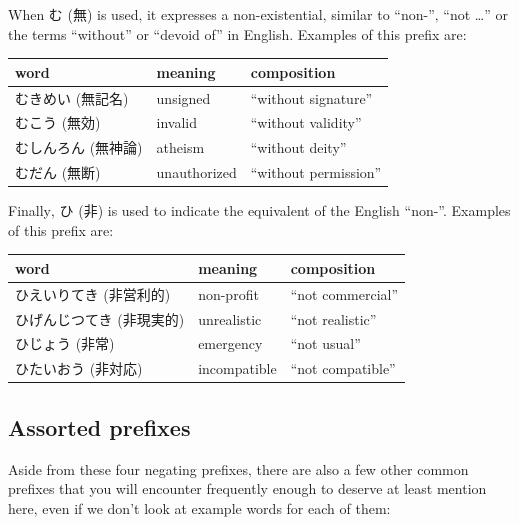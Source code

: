 \documentclass[11pt, b5paper, twoside, openright, onecolumn]{book}
\makeatletter
\newcommand*{\rtrubystack}[2]{{\relscale{0.5}%
  \begin{tabular}[b]{@{}c@{}}%
    {#1}\\%
    {\textscale{2}{#2}}%
  \end{tabular}}%
}
\DeclareRobustCommand*{\rtruby}[2]{%
  \mbox{%
    \setlength{\parskip}{0ex}%
    \BeginAccSupp{method=pdfstringdef,ActualText={#1}}%
      \rtrubystack{\phantom{#2}}{#1}%
      \llap{%
        \rtrubystack{#2}{\phantom{#1}}%
      }%
    \EndAccSupp{}%
  }%
}
\newcommand*{\rubystack}[2]{{\relscale{0.5}%
  \begin{tabular}[b]{@{}c@{}}%
    {#1}\\%
   {\textscale{2}{#2}}%
  \end{tabular}}%
}
\DeclareRobustCommand*{\ruby}[2]{%
  \mbox{%
    \setlength{\parskip}{0ex}%
    \BeginAccSupp{method=pdfstringdef,ActualText={#1}}%
      \rubystack{\phantom{#2}}{#1}%
      \llap{%
        \rubystack{#2}{\phantom{#1}}%
      }%
    \EndAccSupp{}%
  }%
}
\renewcommand*{\rtruby}[2]{#2 (#1)}%
\renewcommand*{\ruby}[2]{#2 (#1)}%
\newenvironment{mytabular}[1]{\noindent\hspace{0.4in}
\begin{tabular}[h]{#1}}{\end{tabular}}
\makeatother
\begin{document}
When \ruby{無}{む} is used‚ it expresses a non-existential‚ similar to “non-”‚ “not …” or the terms “without” or “devoid of” in English. Examples of this prefix are:

\vspace{0.5cm}
\smaller
\begin{mytabular}{| l  l  l |}\hline 
\rule{0pt}{2.4ex}word & meaning & composition\\ 
\hline
\rule{0pt}{3.6ex}\rtruby{無記名}{むきめい} & unsigned & “without signature”\\ 
\rule{0pt}{3.6ex}\rtruby{無効}{むこう} & invalid & “without validity”\\ 
\rule{0pt}{3.6ex}\rtruby{無神論}{むしんろん} & atheism & “without deity”\\ 
\rule{0pt}{3.6ex}\rtruby{無断}{むだん} & unauthorized & “without permission”\\ 
\hline 
\end{mytabular}
\larger
\vspace{0.5cm}


Finally‚ \ruby{非}{ひ} is used to indicate the equivalent of the English “non-”. Examples of this prefix are:

\vspace{0.5cm}
\smaller
\begin{mytabular}{| l  l  l |}\hline 
\rule{0pt}{2.4ex}word & meaning & composition\\ 
\hline
\rule{0pt}{3.6ex}\rtruby{非営利的}{ひえいりてき} & non-profit & “not commercial”\\ 
\rule{0pt}{3.6ex}\rtruby{非現実的}{ひげんじつてき} & unrealistic & “not realistic”\\ 
\rule{0pt}{3.6ex}\rtruby{非常}{ひじょう} & emergency & “not usual”\\ 
\rule{0pt}{3.6ex}\rtruby{非対応}{ひたいおう} & incompatible & “not compatible”\\ 
\hline 
\end{mytabular}
\larger
\subsection{Assorted prefixes}


Aside from these four negating prefixes‚ there are also a few other common prefixes that you will encounter frequently enough to deserve at least mention here‚ even if we don’t look at example words for each of them:
\end{document}
